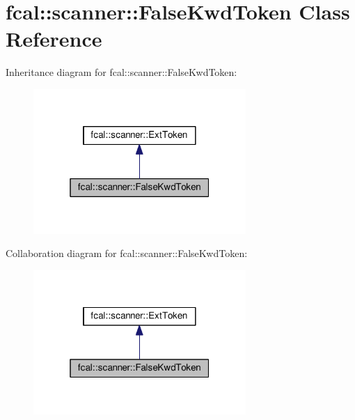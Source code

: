 \hypertarget{classfcal_1_1scanner_1_1FalseKwdToken}{}\section{fcal\+:\+:scanner\+:\+:False\+Kwd\+Token Class Reference}
\label{classfcal_1_1scanner_1_1FalseKwdToken}


Inheritance diagram for fcal\+:\+:scanner\+:\+:False\+Kwd\+Token\+:
\nopagebreak
\begin{figure}[H]
\begin{center}
\leavevmode
\includegraphics[width=229pt]{classfcal_1_1scanner_1_1FalseKwdToken__inherit__graph}
\end{center}
\end{figure}


Collaboration diagram for fcal\+:\+:scanner\+:\+:False\+Kwd\+Token\+:
\nopagebreak
\begin{figure}[H]
\begin{center}
\leavevmode
\includegraphics[width=229pt]{classfcal_1_1scanner_1_1FalseKwdToken__coll__graph}
\end{center}
\end{figure}
